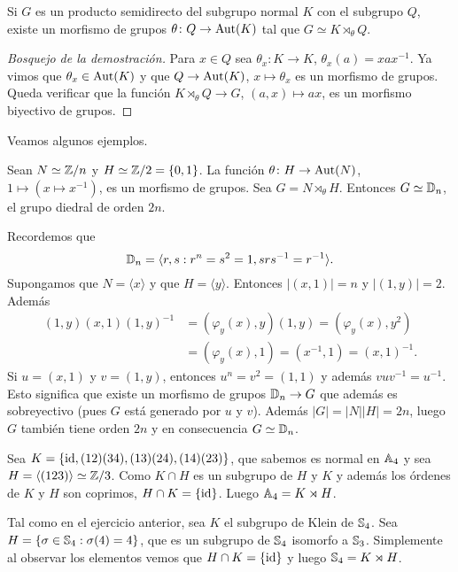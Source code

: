 \begin{proposition}
Si $G$ es un producto semidirecto del subgrupo normal $K$ con el subgrupo $Q$, existe un morfismo de grupos $\theta\colon Q\to\operatorname{Aut}(K)$
tal que $G\simeq K\rtimes_\theta Q$.  
\end{proposition}

\begin{proof}[Bosquejo de la demostración]
Para $x\in Q$ sea $\theta_x\colon K\to K$, $\theta_x(a)=xax^{-1}$. Ya vimos que $\theta_x\in\operatorname{Aut}(K)$ y que $Q\to\operatorname{Aut}(K)$, $x\mapsto\theta_x$ es un morfismo de grupos. Queda verificar que 
la función $K\rtimes_\theta Q\to G$, $(a,x)\mapsto ax$, es un morfismo biyectivo de grupos. 
\end{proof}

Veamos algunos ejemplos.

\begin{example}
Sean $N\simeq \mathbb{Z}/n$ y $H\simeq\mathbb{Z}/2=\{0,1\}$. La función $\theta\colon H\to\operatorname{Aut}(N)$, $1\mapsto (x\mapsto x^{-1})$, es un morfismo de grupos. Sea $G=N\rtimes_\theta H$. 
Entonces $G\simeq\mathbb{D}_n$, el grupo diedral de orden $2n$. 

Recordemos que 
\[
\mathbb{D}_n=\langle r,s:r^n=s^2=1, srs^{-1}=r^{-1}\rangle.
\]
Supongamos que $N=\langle x\rangle$ y que $H=\langle y\rangle$. Entonces $|(x,1)|=n$ y $|(1,y)|=2$. Además
\begin{align*}
(1,y)(x,1)(1,y)^{-1} &= (\varphi_y(x),y)(1,y)=(\varphi_y(x),y^2)\\
&=(\varphi_y(x),1)=(x^{-1},1)=(x,1)^{-1}.
\end{align*}
Si $u=(x,1)$ y $v=(1,y)$, entonces $u^n=v^2=(1,1)$ y además $vuv^{-1}=u^{-1}$. Esto significa que existe un morfismo de grupos
$\mathbb{D}_n\to G$ que además es sobreyectivo (pues $G$ está generado por $u$ y $v$). Además $|G|=|N||H|=2n$, luego $G$ también tiene orden $2n$ y en consecuencia $G\simeq\mathbb{D}_n$. 
\end{example}

\begin{example}
Sea $K=\{\operatorname{id},(12)(34),(13)(24),(14)(23)\}$, que sabemos es normal en $\mathbb{A}_4$ y sea $H=\langle (123)\rangle\simeq\mathbb{Z}/3$. Como $K\cap H$ es un subgrupo de $H$ y $K$ y además
los órdenes de $K$ y $H$ son coprimos, $H\cap K=\{\operatorname{id}\}$. Luego $\mathbb{A}_4=K\rtimes H$. 	
\end{example}

\begin{example}
Tal como en el ejercicio anterior, sea $K$ el subgrupo de Klein de $\mathbb{S}_4$. 
Sea $H=\{\sigma\in\mathbb{S}_4:\sigma(4)=4\}$, que es un subgrupo de $\mathbb{S}_4$ isomorfo a $\mathbb{S}_3$. Simplemente al observar los elementos vemos que $H\cap K=\{\operatorname{id}\}$ y luego
$\mathbb{S}_4=K\rtimes H$.   	
\end{example}

